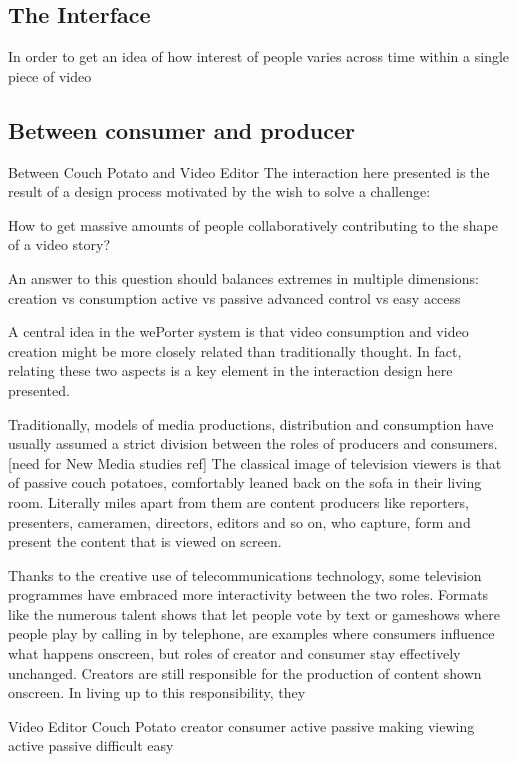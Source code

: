 \subsection{The Interface}




In order to get an idea of how interest of people varies across time within a single piece of video


\subsection{Between consumer and producer}

Between Couch Potato and Video Editor
The interaction here presented is the result of a design process motivated by the wish to solve a challenge:

How to get massive amounts of people collaboratively contributing to the shape of a video story?

An answer to this question should balances extremes in multiple dimensions:
creation vs consumption
active vs passive
advanced control vs easy access

A central idea in the wePorter system is that video consumption and video creation might be more closely related than traditionally thought. In fact, relating these two aspects is a key element in the interaction design here presented.

Traditionally, models of media productions, distribution and consumption have usually assumed a strict division between the roles of producers and consumers. [need for New Media studies ref] The classical image of television viewers is that of passive couch potatoes, comfortably leaned back on the sofa in their living room. Literally miles apart from them are content producers like reporters, presenters, cameramen, directors, editors and so on, who capture, form and present the content that is viewed on screen.

Thanks to the creative use of telecommunications technology, some television programmes have embraced more interactivity between the two roles. Formats like the numerous talent shows that let people vote by text or gameshows where people play by calling in by telephone, are examples where consumers influence what happens onscreen, but roles of creator and consumer stay effectively unchanged. Creators are still responsible for the production of content shown onscreen. In living up to this responsibility, they

Video Editor
Couch Potato
creator
consumer
active
passive
making
viewing
active
passive
difficult
easy

